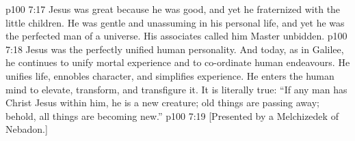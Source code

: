 \vs p100 7:17 Jesus was great because he was good, and yet he fraternized with the little children. He was gentle and unassuming in his personal life, and yet he was the perfected man of a universe. His associates called him Master unbidden.
\vs p100 7:18 Jesus was the perfectly unified human personality. And today, as in Galilee, he continues to unify mortal experience and to co\hyp{}ordinate human endeavours. He unifies life, ennobles character, and simplifies experience. He enters the human mind to elevate, transform, and transfigure it. It is literally true: “If any man has Christ Jesus within him, he is a new creature; old things are passing away; behold, all things are becoming new.”
\vsetoff
\vs p100 7:19 [Presented by a Melchizedek of Nebadon.]
\quizlink
